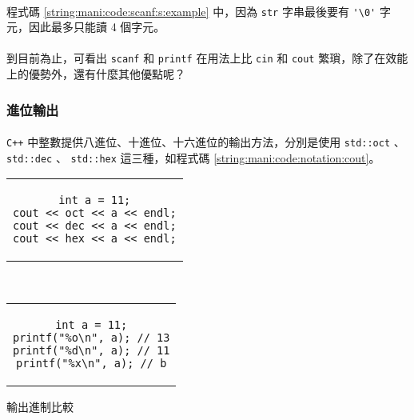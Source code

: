 \documentclass[12pt,a4paper,oneside]{report}
\begin{document}
\begin{CJK}{UTF8}{bkai}
\paragraph{}程式碼 \ref{string:mani:code:scanf:s:example} 中，因為 \lstinline!str! 字串最後要有 \lstinline!'\0'! 字元，因此最多只能讀 4 個字元。
\paragraph{}到目前為止，可看出 \lstinline!scanf! 和 \lstinline!printf! 在用法上比 \lstinline!cin! 和 \lstinline!cout! 繁瑣，除了在效能上的優勢外，還有什麼其他優點呢？

\subsubsection{進位輸出}

\paragraph{}\texttt{C++} 中整數提供八進位、十進位、十六進位的輸出方法，分別是使用 \lstinline!std::oct! 、 \lstinline!std::dec! 、 \lstinline!std::hex! 這三種，如程式碼 \ref{string:mani:code:notation:cout}。

\begin{code}[h!]
  \centering
  \begin{subcode}{.43\textwidth}
    \centering
    \begin{tabular}{c}
    \begin{lstlisting}
int a = 11;
cout << oct << a << endl;
cout << dec << a << endl;
cout << hex << a << endl;
    \end{lstlisting}
    \end{tabular}
    \caption{\lstinline!cout! 版本}
    \label{string:mani:code:notation:cout}
  \end{subcode}
  ~
  \begin{subcode}{.43\textwidth}
    \centering
    \begin{tabular}{c}
    \begin{lstlisting}
int a = 11;
printf("%o\n", a); // 13
printf("%d\n", a); // 11
printf("%x\n", a); // b
    \end{lstlisting}
    \end{tabular}
    \caption{\lstinline!printf! 版本}
    \label{string:mani:code:notation:printf}
  \end{subcode}
  \caption{輸出進制比較}
  \label{string:mani:code:notation}
\end{code}


\end{CJK}
\end{document}
